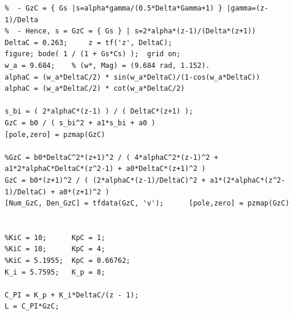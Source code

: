 \documentclass[11pt]{article}
\begin{document}
\begin{lstlisting}[frame=single]
%% (3) Bilinear Transform:
%  - GzC = { Gs |s=alpha*gamma/(0.5*Delta*Gamma+1) } |gamma=(z-1)/Delta
%  - Hence, s = GzC = { Gs } | s=2*alpha*(z-1)/(Delta*(z+1))
DeltaC = 0.263;     z = tf('z', DeltaC);
figure; bode( 1 / (1 + Gs*Cs) );  grid on;
w_a = 9.684;    % (w*, Mag) = (9.684 rad, 1.152).
alphaC = (w_a*DeltaC/2) * sin(w_a*DeltaC)/(1-cos(w_a*DeltaC))
alphaC = (w_a*DeltaC/2) * cot(w_a*DeltaC/2)

s_bi = ( 2*alphaC*(z-1) ) / ( DeltaC*(z+1) );
GzC = b0 / ( s_bi^2 + a1*s_bi + a0 )
[pole,zero] = pzmap(GzC)

%GzC = b0*DeltaC^2*(z+1)^2 / ( 4*alphaC^2*(z-1)^2 + a1*2*alphaC*DeltaC*(z^2-1) + a0*DeltaC*(z+1)^2 )
GzC = b0*(z+1)^2 / ( (2*alphaC*(z-1)/DeltaC)^2 + a1*(2*alphaC*(z^2-1)/DeltaC) + a0*(z+1)^2 )
[Num_GzC, Den_GzC] = tfdata(GzC, 'v');      [pole,zero] = pzmap(GzC)


%KiC = 10;      KpC = 1;
%KiC = 10;      KpC = 4;
%KiC = 5.1955;  KpC = 0.66762;
K_i = 5.7595;   K_p = 8;

C_PI = K_p + K_i*DeltaC/(z - 1);
L = C_PI*GzC;

\end{lstlisting}
\end{document}
